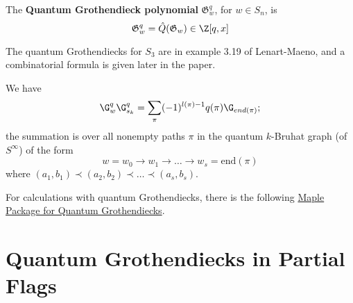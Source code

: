 \documentclass[11pt]{article}
\begin{document}
\begin{definition}
    The \textbf{Quantum Grothendieck polynomial} $\mathfrak{G}_w^q$, for $w \in S_n$, is
    \begin{equation*}
        \mathfrak{G}_w^q = \hat{Q}(\mathfrak{G}_w) \in \Z[q,x]
    \end{equation*}
\end{definition}
The quantum Grothendiecks for $S_3$ are in example 3.19 of Lenart-Maeno, and a combinatorial formula is given later in the paper. \\

\begin{theorem}

We have
\begin{equation*}
    \G_w^q \G_{s_k}^q = \sum_\pi (-1)^{l(\pi)- 1}q(\pi) \G_{end(\pi)} ; 
\end{equation*}
the summation is over all nonempty paths $\pi$ in the quantum $k$-Bruhat graph (of $S^\infty$) of the form 
\begin{equation*}
    w = w_0 \rightarrow w_1 \rightarrow \ldots \rightarrow w_s = \text{end}(\pi)
\end{equation*}
where $(a_1, b_1) \prec (a_2,b_2) \prec \ldots \prec (a_s,b_s)$.
\end{theorem}

For calculations with quantum Grothendiecks, there is the following \href{https://ow3.math.rutgers.edu/~asbuch/equivcalc/}{Maple Package for Quantum Grothendiecks}.

\section{Quantum Grothendiecks in Partial Flags}


\newpage

\end{document}
